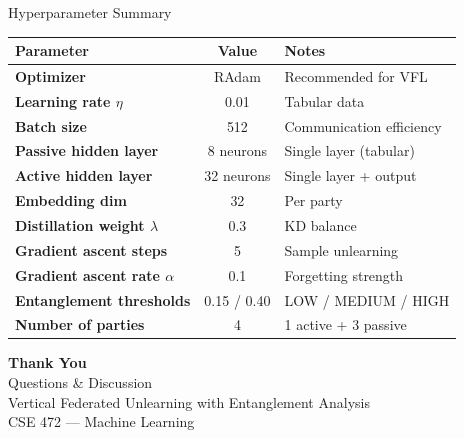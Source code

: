 \documentclass[aspectratio=169, 11pt]{beamer}
\begin{document}
\begin{frame}{Hyperparameter Summary}
  \begin{center}
    \renewcommand{\arraystretch}{1.35}
    \begin{tabular}{>{\bfseries\footnotesize}p{4cm} >{\footnotesize}c >{\footnotesize}p{5cm}}
      \toprule
      \textbf{Parameter} & \textbf{Value} & \textbf{Notes} \\
      \midrule
      \rowcolor{hlrow}
      Optimizer & RAdam & Recommended for VFL \\
      Learning rate $\eta$ & 0.01 & Tabular data \\
      \rowcolor{hlrow}
      Batch size & 512 & Communication efficiency \\
      Passive hidden layer & 8 neurons & Single layer (tabular) \\
      \rowcolor{hlrow}
      Active hidden layer & 32 neurons & Single layer + output \\
      Embedding dim & 32 & Per party \\
      \rowcolor{hlrow}
      Distillation weight $\lambda$ & 0.3 & KD balance \\
      Gradient ascent steps & 5 & Sample unlearning \\
      \rowcolor{hlrow}
      Gradient ascent rate $\alpha$ & 0.1 & Forgetting strength \\
      Entanglement thresholds & 0.15 / 0.40 & LOW / MEDIUM / HIGH \\
      \rowcolor{hlrow}
      Number of parties & 4 & 1 active + 3 passive \\
      \bottomrule
    \end{tabular}
  \end{center}
\end{frame}

\begin{frame}{}
  \begin{center}
    \vspace{1.5cm}
    {\Huge\bfseries\textcolor{deepblue}{Thank You}}\\[0.8cm]
    {\large Questions \& Discussion}\\[0.5cm]
    {\footnotesize Vertical Federated Unlearning with Entanglement Analysis}\\[0.3cm]
    {\scriptsize CSE 472 --- Machine Learning}
  \end{center}
\end{frame}
\end{document}
